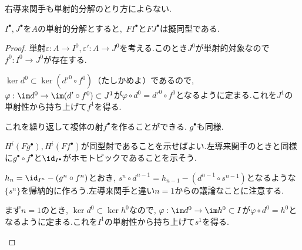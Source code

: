 右導来関手も単射的分解のとり方によらない.

\begin{prop}\label{prop:右導来関手のwell-definedness}
	$I^\bullet,J^\bullet$を$A$の単射的分解とすると,~$F I^\bullet$と$F J^\bullet$は擬同型である.
\end{prop}
\begin{proof}
	単射$\varepsilon:A\to I^0,\varepsilon':A\to J^0$を考える.このとき$J^0$が単射的対象なので$f^0:I^0\to J^0$が存在する.
	\begin{figure}[H]
		\centering
		\caption{}
	\end{figure}

	$\ker d^0\subset\ker(d'^0\circ f^0)$（たしかめよ）であるので, $\varphi:\im d^0\to \im (d'\circ f^0)\subset J^1$が$\varphi\circ d^0=d'^0\circ f^0$となるように定まる.これを$J^1$の単射性から持ち上げて$f^1$を得る.
	
	\begin{figure}[H]
		\centering
		\caption{}
	\end{figure}
	
	これを繰り返して複体の射$f^\bullet$を作ることができる. $g^\bullet$も同様.
	
	$H^i(Fg^\bullet),H^i(Ff^\bullet)$が同型射であることを示せばよい.左導来関手のときと同様に$g^\bullet\circ f^\bullet$と$\id_{I^\bullet}$がホモトピックであることを示そう.
	
	$h_n=\id_{I^n}-(g^n\circ f^n)$とおき, $s^n\circ d^{n-1}=h_{n-1}-(d^{n-1}\circ s^{n-1})$となるような$\{s^n\}$を帰納的に作ろう.左導来関手と違い$n=1$からの議論なことに注意する.
	
	まず$n=1$のとき, $\ker d^0\subset\ker h^0$なので, $\varphi:\im d^0\to\im h^0\subset I$が$\varphi\circ d^0=h^0$となるように定まる.これを$I^1$の単射性から持ち上げて$s^1$を得る.
	
	\begin{figure}[H]
		\centering
		\caption{}
	\end{figure}
	

\end{proof}
